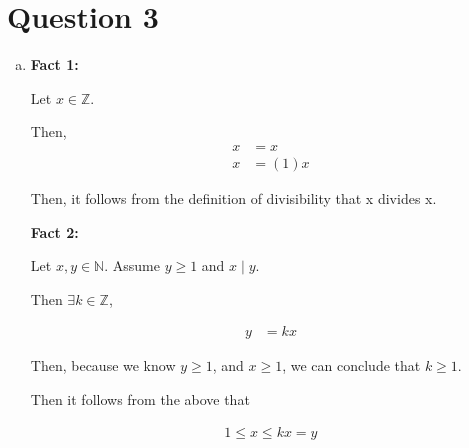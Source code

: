 \documentclass[12pt]{article}
\begin{document}
\section*{Question 3}

\begin{enumerate}[a.]
    \item

    \textbf{Fact 1:}

    \bigskip

    Let $x \in \mathbb{Z}$.

    \bigskip

    Then,
    \setcounter{equation}{0}
    \begin{align}
        x &= x\\
        x &= (1)x
    \end{align}

    \bigskip

    Then, it follows from the definition of divisibility that x divides x.

    \bigskip

    \textbf{Fact 2:}

    \bigskip

    Let $x,y \in \mathbb{N}$. Assume $y \geq 1$ and $x \mid y$.

    \bigskip

    Then $\exists k \in \mathbb{Z}$,

    \setcounter{equation}{0}
    \begin{align}
        y &= kx
    \end{align}

    \bigskip

    Then, because we know $y \geq 1$, and $x \geq 1$, we can conclude that $k \geq 1$.

    \bigskip

    Then it follows from the above that

    \begin{align}
        1 \leq x \leq kx = y
    \end{align}

\end{enumerate}
\end{document}
